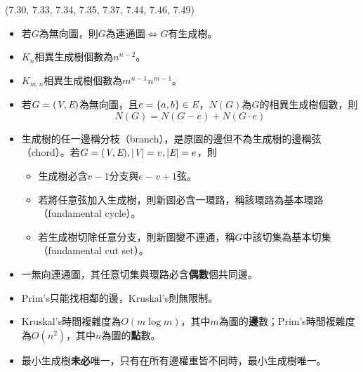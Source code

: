 \item \begin{theorem}{(7.30, 7.33, 7.34, 7.35, 7.37, 7.44, 7.46, 7.49)} \quad\quad
    \begin{itemize}
        \item 若$G$為無向圖，則$G$為連通圖$\iff$$G$有生成樹。
        \item $K_n$相異生成樹個數為$n^{n - 2}$。
        \item $K_{m, n}$相異生成樹個數為$m^{n - 1}n^{m - 1}$。
        \item 若$G = (\textit{V}, \textit{E})$為無向圖，且$e = \{a, b\} \in \textit{E}$，$N(G)$為$G$的相異生成樹個數，則\begin{equation}
            N(G) = N(G - e) + N(G \cdot e)
        \end{equation}
        \item 生成樹的任一邊稱分枝（branch），是原圖的邊但不為生成樹的邊稱弦（chord）。若$G = (\textit{V}, \textit{E}), |\textit{V}| = v, |\textit{E}| = e$，則\begin{itemize}
            \item 生成樹必含$v - 1$分支與$e - v + 1$弦。
            \item 若將任意弦加入生成樹，則新圖必含一環路，稱該環路為基本環路（fundamental cycle）。
            \item 若生成樹切除任意分支，則新圖變不連通，稱$G$中該切集為基本切集（fundamental cut set）。
        \end{itemize}
        \item 一無向連通圖，其任意切集與環路必含\textbf{偶數}個共同邊。
        \item Prim's只能找相鄰的邊，Kruskal's則無限制。
        \item Kruskal's時間複雜度為$O(m\log m)$，其中$m$為圖的\textbf{邊}數；Prim's時間複雜度為$O(n^2)$，其中$n$為圖的\textbf{點}數。
        \item 最小生成樹\textbf{未必}唯一，只有在所有邊權重皆不同時，最小生成樹唯一。
    \end{itemize}
\end{theorem}
